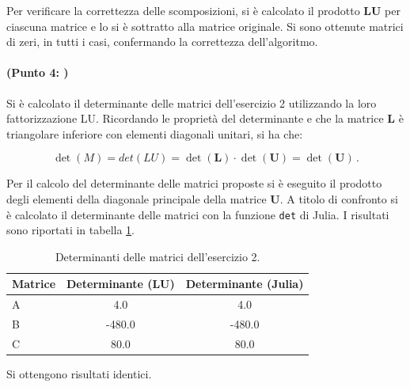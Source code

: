 \documentclass[letterpaper, 12pt]{article}
\begin{document}
Per verificare la correttezza delle scomposizioni, si è calcolato il prodotto $\mathbf{L}\mathbf{U}$ per ciascuna 
matrice e lo si è sottratto alla matrice originale. Si sono ottenute matrici di zeri, in tutti i casi, 
confermando la correttezza dell'algoritmo.

\paragraph{(Punto 4: )} Si è calcolato il determinante delle matrici dell'esercizio 2 utilizzando la loro
fattorizzazione LU. Ricordando le proprietà del determinante e che la matrice $\mathbf{L}$ è triangolare inferiore 
con elementi diagonali unitari, si ha che:

\begin{equation}
    \det(M) = det(LU) = \det(\mathbf{L}) \cdot \det(\mathbf{U}) = \det(\mathbf{U})\,.
\end{equation}

Per il calcolo del determinante delle matrici proposte si è eseguito il prodotto degli elementi della diagonale
principale della matrice $\mathbf{U}$. A titolo di confronto si è calcolato il determinante delle matrici con 
la funzione \texttt{det} di Julia. I risultati sono riportati in tabella \ref{tab:determinanti}.
\begin{table}[!ht]
\centering
\caption{Determinanti delle matrici dell'esercizio 2.}
\label{tab:determinanti}
\begin{tabular}{|l|c|c|}
\hline
\textbf{Matrice} & \textbf{Determinante (LU)} & \textbf{Determinante (Julia)} \\
\hline
A                & 4.0                        & 4.0 \\
B                & -480.0                     & -480.0 \\
C                & 80.0                       & 80.0  \\
\hline
\end{tabular}
\end{table}

Si ottengono risultati identici.
\end{document}
